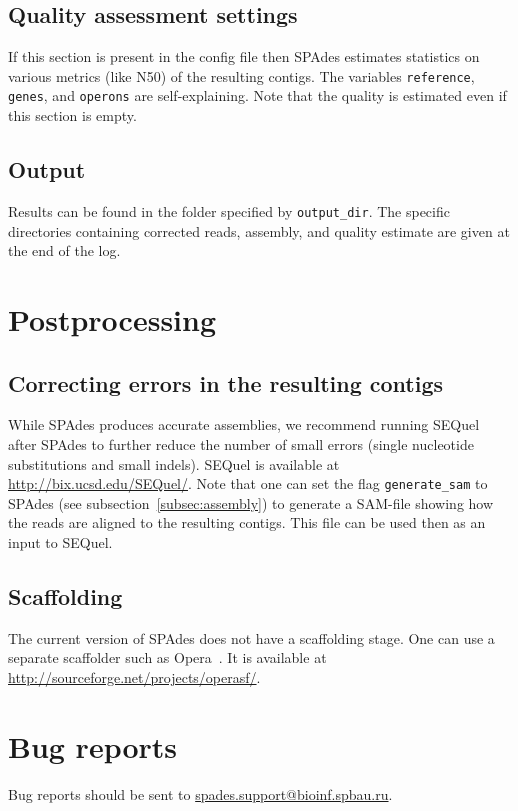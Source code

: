 \documentclass{article}
\def\spades{SPAdes}
\begin{document}
\subsection{Quality assessment settings}
If this section is present in the config file then
{\spades} estimates statistics on various metrics (like N50) of the resulting contigs.
The variables {\tt reference}, {\tt genes}, and {\tt operons} are self-explaining.
Note that the quality is estimated even if this section is empty.

\subsection{Output}
Results can be found in the folder specified by {\tt output\_dir}.
The specific directories containing corrected reads, assembly, and quality estimate are given
at the end of the log.

\section{Postprocessing}

\subsection{Correcting errors in the resulting contigs}
While {\spades} produces accurate assemblies, 
we recommend running SEQuel~\cite{sequel} after {\spades} to further reduce the number of small errors (single nucleotide substitutions and small indels). SEQuel is available at
\url{http://bix.ucsd.edu/SEQuel/}. Note that one can set the flag {\tt generate\_sam} to {\spades}
(see subsection~\ref{subsec:assembly}) to generate a SAM-file showing how the 
reads are aligned to the resulting contigs.
This file can be used then as an input to SEQuel.


\subsection{Scaffolding}
The current version of {\spades} does not have a scaffolding stage.
One can use a separate scaffolder such as Opera~\cite{opera}.
It is available at \url{http://sourceforge.net/projects/operasf/}.

\section{Bug reports}
Bug reports should be sent to \url{spades.support@bioinf.spbau.ru}.




\end{document}
